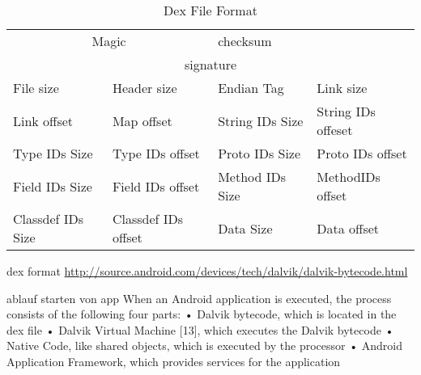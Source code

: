 \begin{table}[]
\centering
\caption{Dex File Format}
\label{table:foundation-forensic-dex}
\begin{tabular}{|l|l|l|l}
\hline
\multicolumn{2}{|c|}{Magic}             & checksum        & \multicolumn{1}{c|}{}                   \\ \cline{1-3}
\multicolumn{4}{|c|}{signature}                                                                     \\ \hline
File size         & Header size         & Endian Tag      & \multicolumn{1}{l|}{Link size}          \\ \hline
Link offset       & Map offset          & String IDs Size & \multicolumn{1}{l|}{String IDs offeset} \\ \hline
Type IDs Size     & Type IDs offset     & Proto IDs Size  & \multicolumn{1}{l|}{Proto IDs offset}   \\ \hline
Field IDs Size    & Field IDs offset    & Method IDs Size & \multicolumn{1}{l|}{MethodIDs offset}   \\ \hline
Classdef IDs Size & Classdef IDs offset & Data Size       & \multicolumn{1}{l|}{Data offset}        \\ \hline
\end{tabular}
\end{table}

dex format \url{http://source.android.com/devices/tech/dalvik/dalvik-bytecode.html}\newline

ablauf starten von app\newline
When an Android application is executed, the process consists of the following four parts:
• Dalvik bytecode, which is located in the dex file
• Dalvik Virtual Machine [13], which executes the Dalvik bytecode
• Native Code, like shared objects, which is executed by the processor
• Android Application Framework, which provides services for the application\newline
